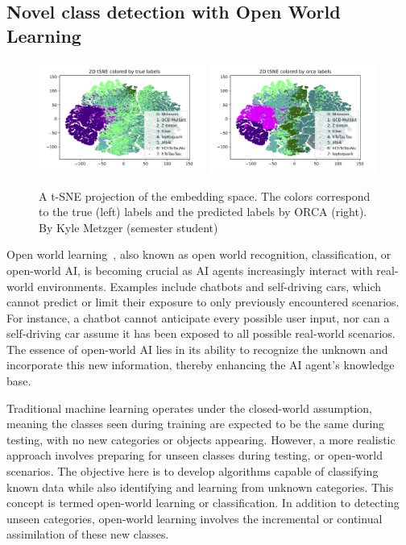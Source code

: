 \documentclass[12pt]{iopart}
\begin{document}
\subsection{Novel class detection with Open World Learning}
\begin{figure}[ht]
    \centering
    \includegraphics[width=0.49\textwidth]{figures/tSNE_2D_true_labels_10.png}
     \includegraphics[width=0.49\textwidth]{figures/tSNE_2D_orca_pred_labels_10.png}
    \caption{A t-SNE projection of the embedding space. The colors correspond to the true (left) labels and the predicted labels by ORCA (right). By Kyle Metzger (semester student) }
    \label{fig:orca}
\end{figure}
Open world learning~\cite{DBLP:journals/corr/abs-2102-03526}, also known as open world recognition, classification, or open-world AI, is becoming crucial as AI agents increasingly interact with real-world environments. Examples include chatbots and self-driving cars, which cannot predict or limit their exposure to only previously encountered scenarios. For instance, a chatbot cannot anticipate every possible user input, nor can a self-driving car assume it has been exposed to all possible real-world scenarios. The essence of open-world AI lies in its ability to recognize the unknown and incorporate this new information, thereby enhancing the AI agent's knowledge base.

Traditional machine learning operates under the closed-world assumption, meaning the classes seen during training are expected to be the same during testing, with no new categories or objects appearing. However, a more realistic approach involves preparing for unseen classes during testing, or open-world scenarios. The objective here is to develop algorithms capable of classifying known data while also identifying and learning from unknown categories. This concept is termed open-world learning or classification. In addition to detecting unseen categories, open-world learning involves the incremental or continual assimilation of these new classes.
\end{document}
